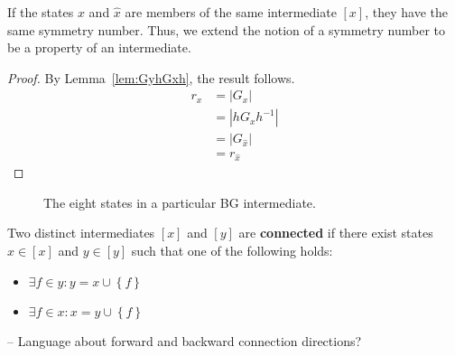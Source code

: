 \begin{mythm}
If the states $x$ and $\hat{x}$ are members of the same intermediate $\left[x\right]$, they have the same symmetry number. Thus, we extend the notion of a symmetry number to be a property of an intermediate.
\end{mythm}
\begin{proof}
By Lemma~\ref{lem:GyhGxh}, the result follows.
\begin{align}
  r_x &= |G_x| \\
  &= |hG_xh^{-1}| \\
   &= |G_{\hat{x}}| \\
  &= r_{\hat{x}}
\end{align}
\end{proof}


\begin{figure}[ht]
\caption{The eight states in a particular BG intermediate.}
\label{fig:CubeState}
\end{figure}


\begin{mydef}
Two distinct intermediates $\left[x\right]$ and $\left[y\right]$ are \textbf{connected} if there exist states $x \in \left[x\right]$ and $y \in \left[y\right]$ such that one of the following holds:
\begin{itemize}
\item $\exists f \in y: y = x \cup \left\{f\right\}$
  \item $\exists f \in x: x = y \cup \left\{f\right\}$
\end{itemize}
\end{mydef}

-- Language about forward and backward connection directions?

